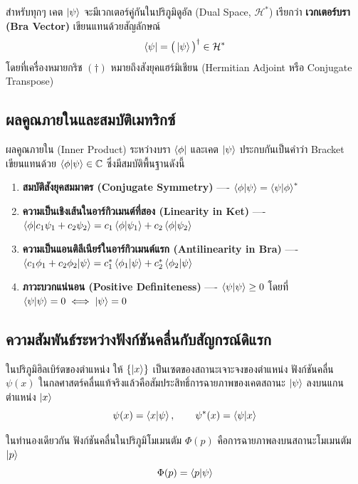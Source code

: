 สำหรับทุกๆ เคต $\ket{\psi}$ จะมีเวกเตอร์คู่กันในปริภูมิดูอัล (Dual Space, $\mathcal{H}^*$) เรียกว่า \textbf{เวกเตอร์บรา (Bra Vector)} เขียนแทนด้วยสัญลักษณ์
\begin{equation}
\bra{\psi} = \big( \ket{\psi} \big)^\dagger \in \mathcal{H}^*
\end{equation}
โดยที่เครื่องหมายกริช $(\dagger)$ หมายถึงสังยุคแฮร์มิเชียน (Hermitian Adjoint หรือ Conjugate Transpose)

\subsection{ผลคูณภายในและสมบัติเมทริกซ์}
ผลคูณภายใน (Inner Product) ระหว่างบรา $\bra{\phi}$ และเคต $\ket{\psi}$ ประกบกันเป็นคำว่า Bracket เขียนแทนด้วย $\braket{\phi}{\psi} \in \mathbb{C}$ ซึ่งมีสมบัติพื้นฐานดังนี้
\begin{enumerate}
    \item \textbf{สมบัติสังยุคสมมาตร (Conjugate Symmetry)} ---- $\braket{\phi}{\psi} = \braket{\psi}{\phi}^*$
    \item \textbf{ความเป็นเชิงเส้นในอาร์กิวเมนต์ที่สอง (Linearity in Ket)} ---- $\braket{\phi}{c_1 \psi_1 + c_2 \psi_2} = c_1 \braket{\phi}{\psi_1} + c_2 \braket{\phi}{\psi_2}$
    \item \textbf{ความเป็นแอนติลีเนียร์ในอาร์กิวเมนต์แรก (Antilinearity in Bra)} ---- $\braket{c_1 \phi_1 + c_2 \phi_2}{\psi} = c_1^* \braket{\phi_1}{\psi} + c_2^* \braket{\phi_2}{\psi}$
    \item \textbf{ภาวะบวกแน่นอน (Positive Definiteness)} ---- $\braket{\psi}{\psi} \ge 0$ โดยที่ $\braket{\psi}{\psi} = 0 \iff \ket{\psi} = 0$
\end{enumerate}

\subsection{ความสัมพันธ์ระหว่างฟังก์ชันคลื่นกับสัญกรณ์ดิแรก}
ในปริภูมิฮิลเบิร์ตของตำแหน่ง ให้ $\{\ket{x}\}$ เป็นเซตของสถานะเจาะจงของตำแหน่ง ฟังก์ชันคลื่น $\psi(x)$ ในกลศาสตร์คลื่นแท้จริงแล้วคือสัมประสิทธิ์การฉายภาพของเคตสถานะ $\ket{\psi}$ ลงบนแกนตำแหน่ง $\ket{x}$
\begin{equation}
\psi(x) = \braket{x}{\psi}, \qquad \psi^*(x) = \braket{\psi}{x}
\label{eq:wavefunc_projection}
\end{equation}

ในทำนองเดียวกัน ฟังก์ชันคลื่นในปริภูมิโมเมนตัม $\Phi(p)$ คือการฉายภาพลงบนสถานะโมเมนตัม $\ket{p}$
\begin{equation}
\Phi(p) = \braket{p}{\psi}
\end{equation}

